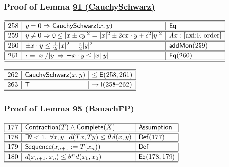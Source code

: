 \documentclass[11pt,reqno]{amsart}
\begin{document}
\medskip

\subsubsection*{Proof of Lemma \hyperlink{lem:CauchySchwarz}{91 (\textsf{CauchySchwarz})}}

\noindent$%
\begin{array}{|r|l|l|}
\hline\hline
258 & y=0\Rightarrow\mathsf{CauchySchwarz}(x,y) & \mathsf{Eq} \\ \hline\hline
259 & y\neq0\Rightarrow0\le|x\pm\epsilon y|^{2}=|x|^{2}\pm2\epsilon x\cdot y+\epsilon^{2}|y|^{2} & Ax:\ref{axi:R-order} \\ \hline\hline
260 & \pm x\cdot y\le\tfrac{1}{2\epsilon}|x|^{2}+\tfrac{\epsilon}{2}|y|^{2} & \mathsf{addMon}(259) \\ \hline\hline
261 & \epsilon=|x|/|y|\Rightarrow\pm x\cdot y\le|x||y| & \mathsf{Eq}(260) \\ \hline\hline
\end{array}%
$

\medskip

\noindent$%
\begin{array}{|r|l|l|}
\hline\hline
262 & \mathsf{CauchySchwarz}(x,y) & \le\mathsf{E}(258,261) \\ \hline\hline
263 & \top & \to\mathsf{I}(258\text{--}262) \\ \hline\hline
\end{array}%
$

\medskip

\subsubsection*{Proof of Lemma \hyperlink{lem:BanachFP}{95 (\textsf{BanachFP})}}

\noindent$%
\begin{array}{|r|l|l|}
\hline\hline
177 & \mathsf{Contraction}(T)\wedge\mathsf{Complete}(X) & \textsf{Assumption} \\ \hline\hline
178 & \exists\theta<1,\;\forall x,y,\;d(Tx,Ty)\le\theta\,d(x,y) & \mathsf{Def}(177) \\ \hline\hline
179 & \mathsf{Sequence}(x_{n+1}:=T(x_{n})) & \mathsf{Def} \\ \hline\hline
180 & d(x_{n+1},x_{n})\le\theta^{n}d(x_{1},x_{0}) & \mathsf{Eq}(178,179) \\ \hline\hline
\end{array}%
$

\medskip
\end{document}
